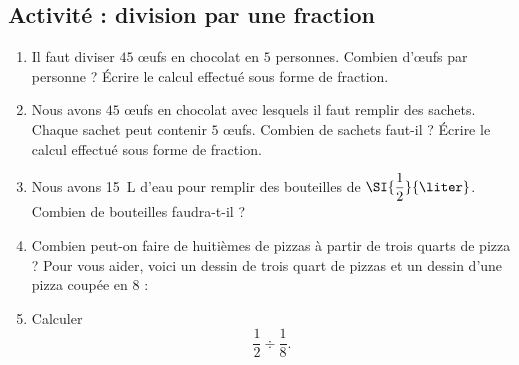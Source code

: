 
\subsection*{Activité : division par une fraction}

\begin{enumerate}
    \item
        Il faut diviser \( 45\) œufs en chocolat en \( 5\) personnes. Combien d'œufs par personne ? Écrire le calcul effectué sous forme de fraction.
    \item
        Nous avons \( 45\) œufs en chocolat avec lesquels il faut remplir des sachets. Chaque sachet peut contenir \( 5\) œufs. Combien de sachets faut-il ? Écrire le calcul effectué sous forme de fraction.
    \item
        Nous avons \SI{15}{\liter} d'eau pour remplir des bouteilles de $\SI{\dfrac{ 1 }{ 2 }}{\liter}$. Combien de bouteilles faudra-t-il ?
    \item
        Combien peut-on faire de huitièmes de pizzas à partir de trois quarts de pizza ? Pour vous aider, voici un dessin de trois quart de pizzas et un dessin d'une pizza coupée en \( 8\) :
        \begin{center}
           
           
        \end{center}
    \item
        Calculer
        \begin{equation}
            \dfrac{ 1 }{ 2 }\div\frac{1}{ 8 }.
        \end{equation}
\end{enumerate}
